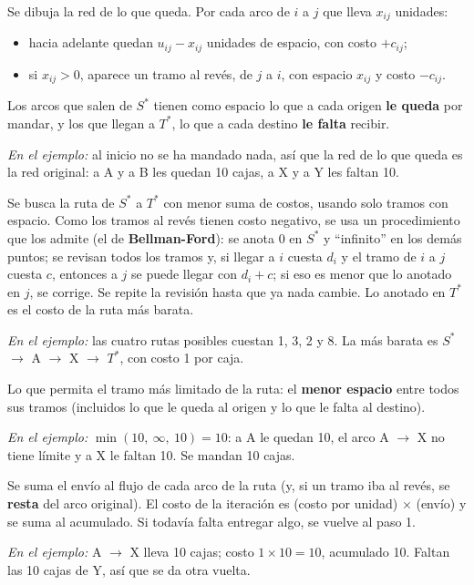 \documentclass[11pt,a4paper]{article}
\newcommand{\Sini}{\ensuremath{S^{*}}}
\newcommand{\Tfin}{\ensuremath{T^{*}}}
\newcommand{\ra}{\ensuremath{\to}}
\begin{document}
Se dibuja la red de lo que queda. Por cada arco de $i$ a $j$ que lleva $x_{ij}$ unidades:
\begin{itemize}[itemsep=2pt]
  \item hacia adelante quedan $u_{ij} - x_{ij}$ unidades de espacio, con costo $+c_{ij}$;
  \item si $x_{ij} > 0$, aparece un tramo al revés, de $j$ a $i$, con espacio $x_{ij}$ y costo $-c_{ij}$.
\end{itemize}
Los arcos que salen de \Sini{} tienen como espacio lo que a cada origen \textbf{le queda} por mandar, y los que llegan a
\Tfin{}, lo que a cada destino \textbf{le falta} recibir.

\textit{En el ejemplo:} al inicio no se ha mandado nada, así que la red de lo que queda es la red original:
a A y a B les quedan 10 cajas, a X y a Y les faltan 10.

Se busca la ruta de \Sini{} a \Tfin{} con menor suma de costos, usando solo tramos con espacio. Como los tramos al
revés tienen costo negativo, se usa un procedimiento que los admite (el de \textbf{Bellman-Ford}): se anota 0 en
\Sini{} y ``infinito'' en los demás puntos; se revisan todos los tramos y, si llegar a $i$ cuesta $d_i$ y el tramo de
$i$ a $j$ cuesta $c$, entonces a $j$ se puede llegar con $d_i + c$; si eso es menor que lo anotado en $j$, se
corrige. Se repite la revisión hasta que ya nada cambie. Lo anotado en \Tfin{} es el costo de la ruta más barata.

\textit{En el ejemplo:} las cuatro rutas posibles cuestan 1, 3, 2 y 8. La más barata es \Sini{} \ra{} A \ra{} X \ra{} \Tfin,
con costo 1 por caja.

Lo que permita el tramo más limitado de la ruta: el \textbf{menor espacio} entre todos sus tramos (incluidos lo que le
queda al origen y lo que le falta al destino).

\textit{En el ejemplo:} $\min(10,\ \infty,\ 10) = 10$: a A le quedan 10, el arco A \ra{} X no tiene límite y a X le
faltan 10. Se mandan 10 cajas.

Se suma el envío al flujo de cada arco de la ruta (y, si un tramo iba al revés, se \textbf{resta} del arco original).
El costo de la iteración es (costo por unidad) $\times$ (envío) y se suma al acumulado. Si todavía falta entregar algo,
se vuelve al paso 1.

\textit{En el ejemplo:} A \ra{} X lleva 10 cajas; costo $1 \times 10 = 10$, acumulado 10. Faltan las 10 cajas de Y,
así que se da otra vuelta.
\end{document}
